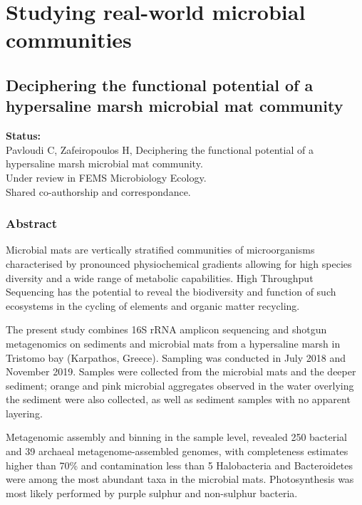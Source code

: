 % 
% 

\chapter{
    Studying real-world microbial communities
}
\label{publ:swamp}


\section{
   Deciphering the functional potential of a hypersaline marsh microbial mat community
}
\label{publ:tristomo-ecology}

\textbf{Status:} \\ 
   Pavloudi C, Zafeiropoulos H, 
   Deciphering the functional potential of a hypersaline marsh microbial mat community.\\
   Under review in FEMS Microbiology Ecology. \\ 
   Shared co-authorship and correspondance.


\subsection{Abstract}

   Microbial mats are vertically stratified communities of microorganisms characterised by 
   pronounced physiochemical gradients allowing for high species diversity 
   and a wide range of metabolic capabilities. 
   High Throughput Sequencing has the potential to reveal the biodiversity and function of such ecosystems 
   in the cycling of elements and organic matter recycling.

   The present study combines 16S rRNA amplicon sequencing and shotgun metagenomics 
   on sediments and microbial mats from a hypersaline marsh in Tristomo bay 
   (Karpathos, Greece). 
   Sampling was conducted in July 2018 and November 2019. 
   Samples were collected from the microbial mats and the deeper sediment; 
   orange and pink microbial aggregates observed in the water overlying the 
   sediment were also collected, as well as sediment samples with no apparent layering.

   Metagenomic assembly and binning in the sample level, revealed 250 bacterial 
   and 39 archaeal metagenome-assembled genomes, 
   with completeness estimates higher than 70\%  and contamination less than 5%
   Halobacteria and Bacteroidetes were among the most abundant taxa in the microbial mats. 
   Photosynthesis was most likely performed by purple sulphur and non-sulphur bacteria. 
   
